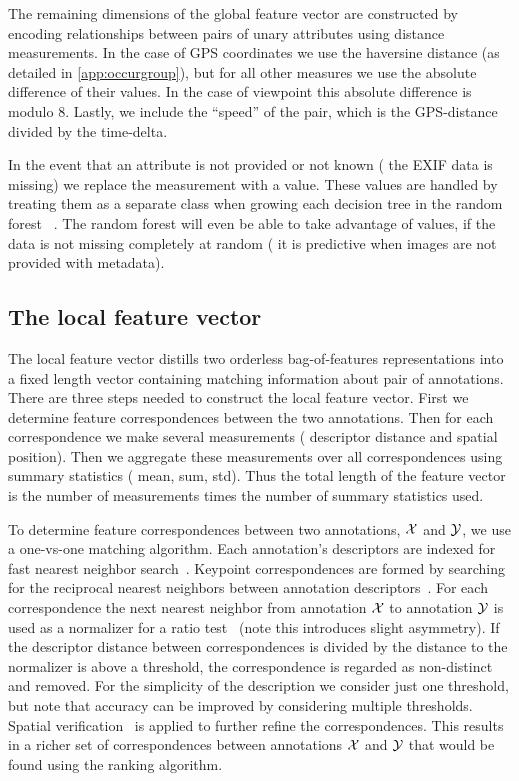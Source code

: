 The remaining dimensions of the global feature vector are constructed by encoding relationships between pairs of
  unary attributes using distance measurements.
In the case of GPS coordinates we use the haversine distance (as detailed in \cref{app:occurgroup}), but for all
  other measures we use the absolute difference of their values.
In the case of viewpoint this absolute difference is modulo $8$.
Lastly, we include the ``speed'' of the pair, which is the GPS-distance divided by the time-delta.

In the event that an attribute is not provided or not known (\eg{} the EXIF data is missing) we replace the
  measurement with a \nan{} value.
These \nan{} values are handled by treating them as a separate class when growing each decision tree in the
  random forest ~\cite{ding_investigation_2010}.
The random forest will even be able to take advantage of \nan{} values, if the data is not missing completely at
  random (\ie{} it is predictive when images are not provided with metadata).

\subsection{The local feature vector}
The local feature vector distills two orderless bag-of-features representations into a fixed length vector
  containing matching information about pair of annotations.
There are three steps needed to construct the local feature vector.
First we determine feature correspondences between the two annotations.
Then for each correspondence we make several measurements (\eg{} descriptor distance and spatial position).
Then we aggregate these measurements over all correspondences using summary statistics (\eg{} mean, sum, std).
Thus the total length of the feature vector is the number of measurements times the number of summary statistics
  used.

To determine feature correspondences between two annotations, $\mathcal{X}$ and $\mathcal{Y}$, we use a one-vs-one matching
  algorithm.
Each annotation's descriptors are indexed for fast nearest neighbor search~\cite{muja_fast_2009}.
Keypoint correspondences are formed by searching for the reciprocal nearest neighbors between annotation
  descriptors~\cite{qin_hello_2011}.
For each correspondence the next nearest neighbor from annotation $\mathcal{X}$ to annotation $\mathcal{Y}$ is used as a
  normalizer for a ratio test~\cite{lowe_distinctive_2004} (note this introduces slight asymmetry).
If the descriptor distance between correspondences is divided by the distance to the normalizer is above a
  threshold, the correspondence is regarded as non-distinct and removed.
For the simplicity of the description we consider just one threshold, but note that accuracy can be improved by
  considering multiple thresholds.
Spatial verification~\cite{philbin_object_2007} is applied to further refine the correspondences.
This results in a richer set of correspondences between annotations $\mathcal{X}$ and $\mathcal{Y}$ that would be found using
  the ranking algorithm.

